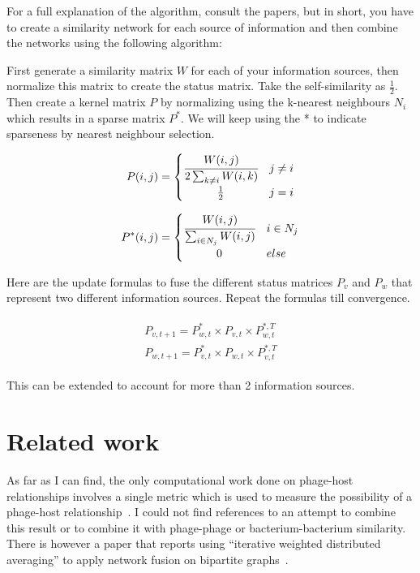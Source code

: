 \documentclass{article}
\begin{document}
For a full explanation of the algorithm,
consult the papers, but in short, you have to create a similarity network
for each source of information and then combine the networks using the 
following algorithm:

First generate a similarity matrix $W$ for each of your information sources, 
then normalize this matrix to create the status matrix.
Take the self-similarity as $\frac{1}{2}$.
Then create a kernel matrix $P$ 
by normalizing using the k-nearest neighbours $N_i$ which 
results in a sparse matrix $P^*$. We will keep using the * to indicate sparseness
by nearest neighbour selection.

\begin{equation}
    P(i, j) = 
    \begin{cases}
        \cfrac{W(i, j)}{2 \sum_{k \neq i}W(i, k)} & j \neq i \\
        \hfil \frac{1}{2} & j = i
    \end{cases}
\end{equation}

\begin{equation}
    P^*(i, j) = 
    \begin{cases}
        \cfrac{W(i, j)}{\sum_{i \in N_j}W(i, j)} & i \in N_j \\
        \hfil 0 & else
    \end{cases}
\end{equation} 

Here are the update formulas to fuse the different status matrices $P_v$ and $P_w$ that 
represent two different information sources. Repeat the formulas till convergence.

\begin{align}
    \begin{split}
        P_{v, t+1} = P^*_{w, t} \times P_{v, t} \times P^{*,T}_{w, t} \\
        P_{w, t+1} = P^*_{v, t} \times P_{w, t} \times P^{*,T}_{v, t}
    \end{split}
\end{align}

This can be extended to account for more than 2 information sources.

\section{Related work}

As far as I can find, the only computational work done on phage-host relationships 
involves a single metric which is used to measure the possibility of a phage-host relationship~\cite{edwards2016computational}.
I could not find references to an attempt to combine this result or to combine
it with phage-phage or bacterium-bacterium similarity.
There is however a paper that reports using ``iterative weighted distributed averaging''
to apply network fusion on bipartite graphs~\cite{khan2007distributed}.
\end{document}
